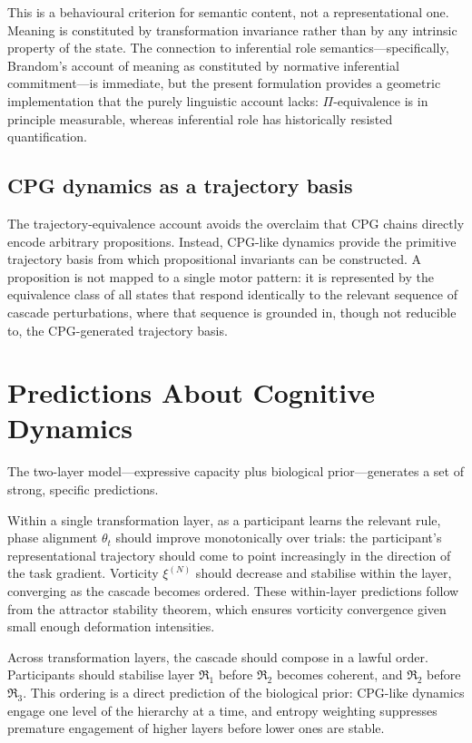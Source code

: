 \documentclass[12pt, a4paper]{article}
\theoremstyle{remark}
\theoremstyle{definition}
\newcommand{\Rk}{\mathfrak{R}}
\begin{document}
This is a behavioural criterion for semantic content, not a representational one.  Meaning
is constituted by transformation invariance rather than by any intrinsic property of the
state.  The connection to inferential role semantics---specifically, Brandom's account of
meaning as constituted by normative inferential commitment---is immediate, but the present
formulation provides a geometric implementation that the purely linguistic account lacks:
$\Pi$-equivalence is in principle measurable, whereas inferential role has historically
resisted quantification.

\subsection{CPG dynamics as a trajectory basis}

The trajectory-equivalence account avoids the overclaim that CPG chains directly encode
arbitrary propositions.  Instead, CPG-like dynamics provide the primitive trajectory basis
from which propositional invariants can be constructed.  A proposition is not mapped to a
single motor pattern: it is represented by the equivalence class of all states that respond
identically to the relevant sequence of cascade perturbations, where that sequence is
grounded in, though not reducible to, the CPG-generated trajectory basis.

\section{Predictions About Cognitive Dynamics}
\label{sec:predictions}

The two-layer model---expressive capacity plus biological prior---generates a set of strong,
specific predictions.

Within a single transformation layer, as a participant learns the relevant rule, phase
alignment $\theta_t$ should improve monotonically over trials: the participant's
representational trajectory should come to point increasingly in the direction of the task
gradient.  Vorticity $\xi^{(N)}$ should decrease and stabilise within the layer, converging
as the cascade becomes ordered.  These within-layer predictions follow from the attractor
stability theorem, which ensures vorticity convergence given small enough deformation
intensities.

Across transformation layers, the cascade should compose in a lawful order.  Participants
should stabilise layer $\Rk_1$ before $\Rk_2$ becomes coherent, and $\Rk_2$ before
$\Rk_3$.  This ordering is a direct prediction of the biological prior: CPG-like dynamics
engage one level of the hierarchy at a time, and entropy weighting suppresses premature
engagement of higher layers before lower ones are stable.
\end{document}
